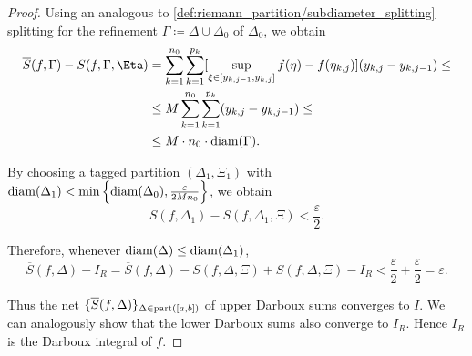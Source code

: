 \begin{proof}
  Using an analogous to \eqref{def:riemann_partition/subdiameter_splitting} splitting for the refinement \( \Gamma \coloneqq \Delta \cup \Delta_0 \) of \( \Delta_0 \), we obtain
  \begin{align*}
    \overline{S}(f, \Gamma) - S(f, \Gamma, \Eta)
    &=
    \sum_{k=1}^{n_0} \sum_{k=1}^{p_k} [ \sup_{\xi \in [y_{k,j-1}, y_{k,j}]} f(\eta) - f(\eta_{k,j}) ] (y_{k,j} - y_{k,j-1})
    \leq \\ &\leq
    M \sum_{k=1}^{n_0} \sum_{k=1}^{p_k} (y_{k,j} - y_{k,j-1})
    \leq \\ &\leq
    M \cdot n_0 \cdot \Diam(\Gamma).
  \end{align*}

  By choosing a tagged partition \( (\Delta_1, \Xi_1) \) with \( \operatorname{diam}(\Delta_1) < \min \left\{ \operatorname{diam}(\Delta_0), \frac \varepsilon {2 M n_0} \right\} \), we obtain
  \begin{equation*}
    \overline{S}(f, \Delta_1) - S(f, \Delta_1, \Xi) < \frac \varepsilon 2.
  \end{equation*}

  Therefore, whenever \( \operatorname{diam}(\Delta) \leq \operatorname{diam}(\Delta_1) \),
  \begin{equation*}
    \overline{S}(f, \Delta) - I_R
    =
    \overline{S}(f, \Delta) - S(f, \Delta, \Xi) + S(f, \Delta, \Xi) - I_R
    <
    \frac \varepsilon 2 + \frac \varepsilon 2
    =
    \varepsilon.
  \end{equation*}

  Thus the net \( \{ \overline{S}(f, \Delta) \}_{\Delta \in \operatorname{part}([a, b])} \) of upper Darboux sums converges to \( I \). We can analogously show that the lower Darboux sums also converge to \( I_R \). Hence \( I_R \) is the Darboux integral of \( f \).
\end{proof}

